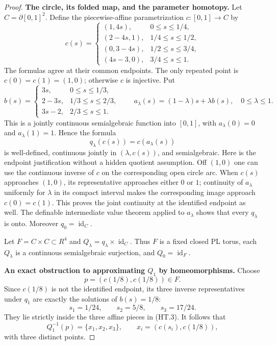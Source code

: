 \begin{proof}
\textbf{The circle, its folded map, and the parameter homotopy.}\quad
Let $C=\partial[0,1]^2$. Define the piecewise-affine parametrization
$c:[0,1]\to C$ by
\[
 c(s)=
 \begin{cases}
 (1,4s),&0\le s\le1/4,\\
 (2-4s,1),&1/4\le s\le1/2,\\
 (0,3-4s),&1/2\le s\le3/4,\\
 (4s-3,0),&3/4\le s\le1.
 \end{cases}
\tag{HT.2}
\]
The formulas agree at their common endpoints. The only repeated point
is $c(0)=c(1)=(1,0)$; otherwise $c$ is injective. Put
\[
 b(s)=
 \begin{cases}
 3s,&0\le s\le1/3,\\
 2-3s,&1/3\le s\le2/3,\\
 3s-2,&2/3\le s\le1.
 \end{cases}
 \qquad
 a_\lambda(s)=(1-\lambda)s+\lambda b(s),\quad0\le\lambda\le1.
\tag{HT.3}
\]
This is a jointly continuous semialgebraic function into $[0,1]$,
with $a_\lambda(0)=0$ and $a_\lambda(1)=1$. Hence the formula
\[
 q_\lambda(c(s))=c(a_\lambda(s))
\tag{HT.4}
\]
is well-defined, continuous jointly in $(\lambda,c(s))$, and
semialgebraic. Here is the endpoint justification without a hidden
quotient assumption. Off $(1,0)$ one can use the continuous inverse
of $c$ on the corresponding open circle arc. When $c(s)$ approaches
$(1,0)$, its representative approaches either $0$ or $1$; continuity
of $a_\lambda$ uniformly for $\lambda$ in its compact interval makes
the corresponding image approach $c(0)=c(1)$. This proves the joint
continuity at the identified endpoint as well. The definable
intermediate value theorem applied to $a_\lambda$ shows that every
$q_\lambda$ is onto. Moreover $q_0=\operatorname{id}_C$.

Let $F=C\times C\subset R^4$ and
$Q_\lambda=q_\lambda\times\operatorname{id}_C$. Thus $F$ is a
fixed closed PL torus, each $Q_\lambda$ is a continuous semialgebraic
surjection, and $Q_0=\operatorname{id}_F$.

\textbf{An exact obstruction to approximating $Q_1$ by homeomorphisms.}\quad
Choose
\[
 p=(c(1/8),c(1/8))\in F.
\]
Since $c(1/8)$ is not the identified endpoint, its three inverse
representatives under $q_1$ are exactly the solutions of $b(s)=1/8$:
\[
 s_1=1/24,\qquad s_2=5/8,\qquad s_3=17/24.
\tag{HT.5}
\]
They lie strictly inside the three affine pieces in (HT.3).
It follows that
\[
 Q_1^{-1}(p)=\{x_1,x_2,x_3\},
 \qquad x_i=(c(s_i),c(1/8)),
\tag{HT.6}
\]
with three distinct points.


\end{proof}
